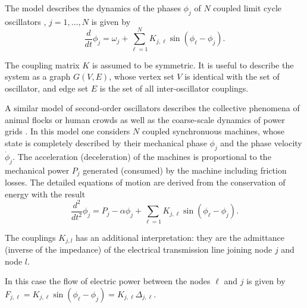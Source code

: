 \documentclass[10pt,aps,pra,onecolumn,superscriptaddress]{revtex4-1}
\newcommand{\be}{\begin{equation}}
\newcommand{\ee}{\end{equation}}
\begin{document}
The model describes the dynamics of the phases $\phi_j$
of $N$ coupled limit cycle oscillators 
\cite{Kura84},
$j = 1,\ldots,N$ is given by
\be
   \frac{d}{dt} \phi_j = \omega_j  + \sum_{\ell = 1}^N
      K _{j,\ell} \sin(\phi_\ell - \phi_j).
   \label{eqn:kuramoto}
\ee 


The coupling matrix $K$ is assumed to be symmetric.  It is useful to describe 
the system as a 
graph $G(V,E)$, whose vertex set $V$ is identical with the set of oscillator, 
and edge set $E$ is the set of all inter-oscillator couplings.  


A similar model of second-order oscillators describes
the collective phenomena of animal flocks \cite{Erme91,Ha10} or
human crowds \cite{Stro05} as well as the coarse-scale
dynamics of power grids
\cite{Fila08, 12powergrid,Mott13,Dorf13}.
In this 
model one considers $N$ coupled synchronuous machines, 
whose state is completely described by their mechanical 
phase $\phi_j$ and the phase velocity $\dot \phi_j$. The
acceleration (deceleration) of the machines is proportional
to the mechanical power $P_j$ generated (consumed) 
by the machine including friction losses. The detailed
equations of motion are derived from the conservation 
of energy with the result
\be
   \frac{d^2}{dt^2} \phi_j = P_j - \alpha \phi_j
             + \sum_{\ell = 1} K _{j,\ell} \sin(\phi_\ell - \phi_j). 
  \label{eqn:power}
\ee

The couplings $K_{j,l}$ has an additional interpretation: they are the 
admittance (inverse of the impedance) of the electrical transmission line 
joining node $j$ and node $l$.  

In this case the flow of electric power between the nodes
$\ell$ and $j$ is given by 
$F_{j,\ell}= K _{j,\ell} \sin(\phi_\ell - \phi_j) 
=  K _{j,\ell}  \Delta_{j,\ell}$.
\end{document}
